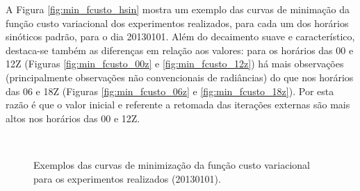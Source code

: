 A Figura \ref{fig:min_fcusto_hsin} mostra um exemplo das curvas de minimação da função custo variacional dos experimentos realizados, para cada um dos horários sinóticos padrão, para o dia 20130101. Além do decaimento suave e característico, destaca-se também as diferenças em relação aos valores: para os horários das 00 e 12Z (Figuras \ref{fig:min_fcusto_00z} e \ref{fig:min_fcusto_12z}) há mais observações (principalmente observações não convencionais de radiâncias) do que nos horários das 06 e 18Z (Figuras \ref{fig:min_fcusto_06z} e \ref{fig:min_fcusto_18z}). Por esta razão é que o valor inicial e referente a retomada das iterações externas são mais altos nos horários das 00 e 12Z.

\begin{figure}[H]
    \vspace{2mm}
    \caption{Exemplos das curvas de minimização da função custo variacional para os experimentos realizados (20130101).}
    \begin{center}
        \\
\end{center}
\end{figure}
